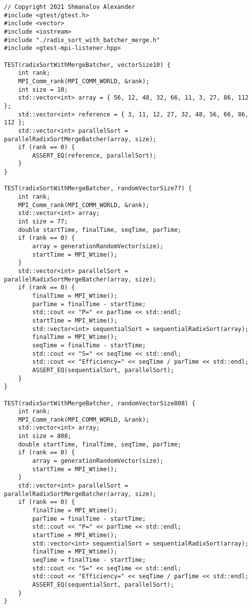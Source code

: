 \documentclass{report}
\begin{document}
\begin{lstlisting}
// Copyright 2021 Shmanalov Alexander
#include <gtest/gtest.h>
#include <vector>
#include <iostream>
#include "./radix_sort_with_batcher_merge.h"
#include <gtest-mpi-listener.hpp>

TEST(radixSortWithMergeBatcher, vectorSize10) {
    int rank;
    MPI_Comm_rank(MPI_COMM_WORLD, &rank);
    int size = 10;
    std::vector<int> array = { 56, 12, 48, 32, 66, 11, 3, 27, 86, 112 };
    std::vector<int> reference = { 3, 11, 12, 27, 32, 48, 56, 66, 86, 112 };
    std::vector<int> parallelSort = parallelRadixSortMergeBatcher(array, size);
    if (rank == 0) {
        ASSERT_EQ(reference, parallelSort);
    }
}

TEST(radixSortWithMergeBatcher, randomVectorSize77) {
    int rank;
    MPI_Comm_rank(MPI_COMM_WORLD, &rank);
    std::vector<int> array;
    int size = 77;
    double startTime, finalTime, seqTime, parTime;
    if (rank == 0) {
        array = generationRandomVector(size);
        startTime = MPI_Wtime();
    }
    std::vector<int> parallelSort = parallelRadixSortMergeBatcher(array, size);
    if (rank == 0) {
        finalTime = MPI_Wtime();
        parTime = finalTime - startTime;
        std::cout << "P=" << parTime << std::endl;
        startTime = MPI_Wtime();
        std::vector<int> sequentialSort = sequentialRadixSort(array);
        finalTime = MPI_Wtime();
        seqTime = finalTime - startTime;
        std::cout << "S=" << seqTime << std::endl;
        std::cout << "Efficiency=" << seqTime / parTime << std::endl;
        ASSERT_EQ(sequentialSort, parallelSort);
    }
}

TEST(radixSortWithMergeBatcher, randomVectorSize808) {
    int rank;
    MPI_Comm_rank(MPI_COMM_WORLD, &rank);
    std::vector<int> array;
    int size = 808;
    double startTime, finalTime, seqTime, parTime;
    if (rank == 0) {
        array = generationRandomVector(size);
        startTime = MPI_Wtime();
    }
    std::vector<int> parallelSort = parallelRadixSortMergeBatcher(array, size);
    if (rank == 0) {
        finalTime = MPI_Wtime();
        parTime = finalTime - startTime;
        std::cout << "P=" << parTime << std::endl;
        startTime = MPI_Wtime();
        std::vector<int> sequentialSort = sequentialRadixSort(array);
        finalTime = MPI_Wtime();
        seqTime = finalTime - startTime;
        std::cout << "S=" << seqTime << std::endl;
        std::cout << "Efficiency=" << seqTime / parTime << std::endl;
        ASSERT_EQ(sequentialSort, parallelSort);
    }
}


\end{lstlisting}
\end{document}
